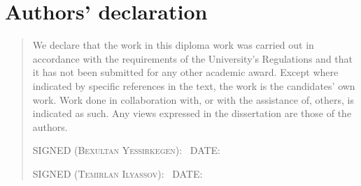 %
%
\chapter{Authors' declaration}
\begin{SingleSpace}
\begin{quote}
We declare that the work in this diploma work was carried out in accordance with the requirements of the University's Regulations and that it has not been submitted for any other academic award. Except where indicated by specific references in the text, the work is the candidates' own work. Work done in collaboration with, or with the assistance of, others, is indicated as such. Any views expressed in the dissertation are those of the authors.

\vspace{1cm}
\noindent
\hspace{-0.75cm}\textsc{SIGNED (Bexultan Yessirkegen):} \dotfill \ \textsc{DATE:} \dotfill

\vspace{0.8cm}
\noindent
\hspace{-0.75cm}\textsc{SIGNED (Temirlan Ilyassov):} \dotfill \ \textsc{DATE:} \dotfill
\end{quote}
\end{SingleSpace}
\clearpage
